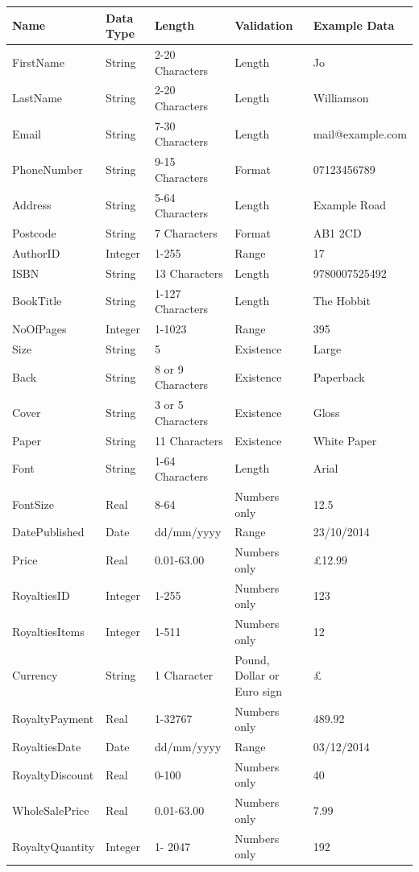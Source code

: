 \begin{center}
\begin{tabular}{|p{2cm}|p{1cm}|p{2.5cm}|p{1.5cm}|p{3cm}|}
    \hline
    \textbf{Name} & \textbf{Data Type} & \textbf{Length} & \textbf{Validation} & \textbf{Example Data} \\ \hline
    FirstName & String & 2-20 Characters & Length & Jo  \\ \hline
    LastName & String & 2-20 Characters & Length & Williamson  \\ \hline
    Email & String & 7-30 Characters & Length & mail@example.com  \\ \hline
    PhoneNumber & String & 9-15 Characters & Format & 07123456789  \\ \hline
    Address & String & 5-64 Characters & Length & Example Road  \\ \hline
    Postcode & String & 7 Characters & Format & AB1 2CD  \\ \hline
    AuthorID & Integer & 1-255 & Range & 17  \\ \hline
    ISBN & String & 13 Characters & Length & 9780007525492 \\ \hline
    BookTitle & String & 1-127 Characters & Length & The Hobbit  \\ \hline
    NoOfPages & Integer & 1-1023 & Range & 395  \\ \hline
    Size & String & 5 & Existence & Large \\ \hline
    Back & String & 8 or 9 Characters& Existence & Paperback  \\ \hline
    Cover & String & 3 or 5 Characters & Existence & Gloss \\ \hline
    Paper & String & 11 Characters & Existence & White Paper\\ \hline
    Font & String & 1-64 Characters & Length & Arial  \\ \hline
    FontSize & Real & 8-64 & Numbers only & 12.5  \\ \hline
    DatePublished & Date & dd/mm/yyyy & Range & 23/10/2014 \\ \hline
    Price & Real & 0.01-63.00 & Numbers only & £12.99 \\ \hline
    RoyaltiesID & Integer & 1-255 & Numbers only & 123 \\ \hline
    RoyaltiesItems & Integer & 1-511 & Numbers only & 12 \\ \hline
    Currency & String & 1 Character & Pound, Dollar or Euro sign & £ \\ \hline
    RoyaltyPayment & Real & 1-32767 & Numbers only & 489.92 \\ \hline
    RoyaltiesDate & Date & dd/mm/yyyy & Range & 03/12/2014 \\ \hline
    RoyaltyDiscount & Real & 0-100 & Numbers only & 40 \\ \hline
    WholeSalePrice & Real & 0.01-63.00 & Numbers only & 7.99 \\ \hline
    RoyaltyQuantity & Integer & 1- 2047 & Numbers only & 192 \\ \hline
\end{tabular}
\end{center}

